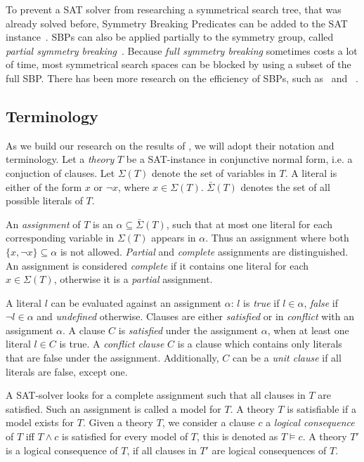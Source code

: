 To prevent a SAT solver from researching a symmetrical search tree, that was already solved
before, Symmetry Breaking Predicates can be added to the SAT
instance~\cite{sakallah2009symmetry}. SBPs can also be applied partially to the symmetry
group, called \textit{partial symmetry breaking}~\cite{sakallah2009symmetry}. Because
\textit{full symmetry breaking} sometimes costs a lot of time, most symmetrical search
spaces can be blocked by using a subset of the full SBP. There has been more research on
the efficiency of SBPs, such as~\cite{aloul2006efficient,aloul2003shatter,crawford1996symmetry} and
~\cite{sabharwal2005symchaff}.

\subsection{Terminology}
	As we build our research on the results of \cite{devriendt2012symmetry}, we will adopt
	their notation and terminology.
	Let a \emph{theory} $T$ be a SAT-instance in conjunctive normal form, i.e. a conjuction
	of clauses.
	Let $\Sigma(T)$ denote the set of variables in $T$.
	A literal is either of the form	$x$ or $\neg x$, where $x \in \Sigma(T)$.
	$\bar\Sigma(T)$ denotes the set of all possible literals of $T$.

	An \emph{assignment} of $T$ is an $\alpha \subseteq \bar\Sigma(T)$, such that at most
	one literal for each corresponding variable in $\Sigma(T)$ appears in $\alpha$.
	Thus an assignment where both $\{x, \neg x\} \subseteq \alpha$ is not allowed.
	\emph{Partial} and \emph{complete} assignments are distinguished.
	An assignment is considered \emph{complete} if it contains one literal for each $x \in \Sigma(T)$,
	otherwise it is a \emph{partial} assignment.

	A literal $l$ can be evaluated against an assignment $\alpha$: $l$ is \emph{true} if $l \in
	\alpha$, \emph{false} if $\neg l \in \alpha$ and \emph{undefined} otherwise.
	Clauses are either \emph{satisfied} or in \emph{conflict} with an assignment $\alpha$.
	A clause $C$ is \emph{satisfied} under the assignment $\alpha$,
	when at least one literal $l \in C$ is true.
	A \emph{conflict clause} $C$ is a clause which contains only literals that are false under the assignment.
	Additionally, $C$ can be a \emph{unit clause} if all literals are false, except one.

	A SAT-solver looks for a complete assignment such that all clauses in $T$ are satisfied.
	Such an assignment is called a model for $T$.
	A theory $T$ is satisfiable if a model exists for $T$.
	Given a theory $T$, we consider a clause $c$ a \emph{logical consequence} of $T$ iff
	$T \wedge c$ is satisfied for every model of $T$, this is denoted as $T \models c$.
	A theory $T'$ is a logical consequence of $T$, if all clauses in $T'$ are logical
	consequences of $T$.

